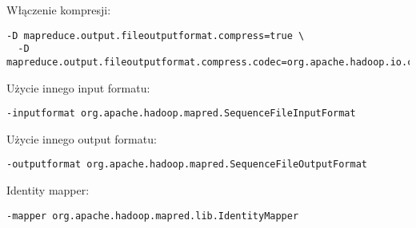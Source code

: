 \documentclass{article}
\begin{document}
Włączenie kompresji:
\begin{lstlisting}
-D mapreduce.output.fileoutputformat.compress=true \
  -D mapreduce.output.fileoutputformat.compress.codec=org.apache.hadoop.io.compress.GzipCodec
\end{lstlisting} 
Użycie innego input formatu:
\begin{lstlisting}
-inputformat org.apache.hadoop.mapred.SequenceFileInputFormat
\end{lstlisting}
Użycie innego output formatu:
\begin{lstlisting}
-outputformat org.apache.hadoop.mapred.SequenceFileOutputFormat
\end{lstlisting}
Identity mapper:
\begin{lstlisting}
-mapper org.apache.hadoop.mapred.lib.IdentityMapper
\end{lstlisting}
\end{document}
